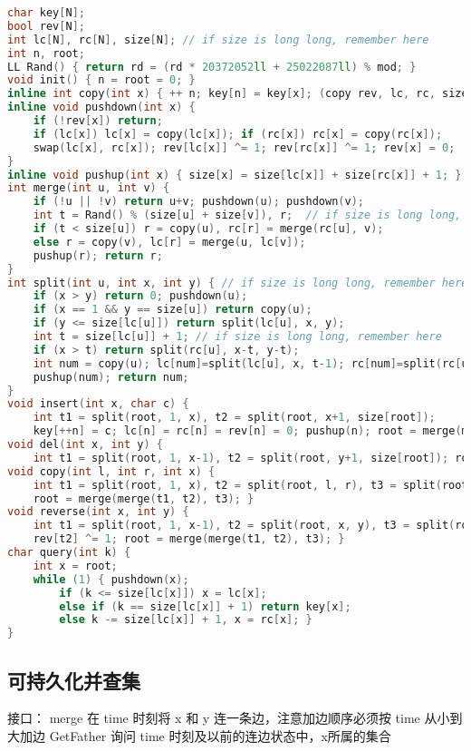 \documentclass{article}
\begin{document}
\begin{lstlisting}[language=C++]
char key[N];
bool rev[N];
int lc[N], rc[N], size[N]; // if size is long long, remember here
int n, root;
LL Rand() { return rd = (rd * 20372052ll + 25022087ll) % mod; }
void init() { n = root = 0; }
inline int copy(int x) { ++ n; key[n] = key[x]; (copy rev, lc, rc, size); return n; }
inline void pushdown(int x) {
	if (!rev[x]) return;
	if (lc[x]) lc[x] = copy(lc[x]); if (rc[x]) rc[x] = copy(rc[x]);
	swap(lc[x], rc[x]); rev[lc[x]] ^= 1; rev[rc[x]] ^= 1; rev[x] = 0;
}
inline void pushup(int x) { size[x] = size[lc[x]] + size[rc[x]] + 1; }
int merge(int u, int v) {
	if (!u || !v) return u+v; pushdown(u); pushdown(v);
	int t = Rand() % (size[u] + size[v]), r;  // if size is long long, remember here
	if (t < size[u]) r = copy(u), rc[r] = merge(rc[u], v);
	else r = copy(v), lc[r] = merge(u, lc[v]);
	pushup(r); return r;
}
int split(int u, int x, int y) { // if size is long long, remember here
	if (x > y) return 0; pushdown(u);
	if (x == 1 && y == size[u]) return copy(u);
	if (y <= size[lc[u]]) return split(lc[u], x, y);
	int t = size[lc[u]] + 1; // if size is long long, remember here
	if (x > t) return split(rc[u], x-t, y-t);
	int num = copy(u); lc[num]=split(lc[u], x, t-1); rc[num]=split(rc[u], 1, y-t);
	pushup(num); return num;
}
void insert(int x, char c) {
	int t1 = split(root, 1, x), t2 = split(root, x+1, size[root]);
	key[++n] = c; lc[n] = rc[n] = rev[n] = 0; pushup(n); root = merge(merge(t1, n), t2); }
void del(int x, int y) {
	int t1 = split(root, 1, x-1), t2 = split(root, y+1, size[root]); root = merge(t1, t2); }
void copy(int l, int r, int x) {
	int t1 = split(root, 1, x), t2 = split(root, l, r), t3 = split(root, x+1, size[root]);
	root = merge(merge(t1, t2), t3); }
void reverse(int x, int y) {
	int t1 = split(root, 1, x-1), t2 = split(root, x, y), t3 = split(root, y+1, size[root]);
	rev[t2] ^= 1; root = merge(merge(t1, t2), t3); }
char query(int k) {
	int x = root;
	while (1) {	pushdown(x);
		if (k <= size[lc[x]]) x = lc[x];
		else if (k == size[lc[x]] + 1) return key[x];
		else k -= size[lc[x]] + 1, x = rc[x]; }
}
\end{lstlisting}
\subsection{可持久化并查集}

接口：
 merge 在 time 时刻将 x 和 y 连一条边，注意加边顺序必须按 time 从小到大加边
 GetFather 询问 time 时刻及以前的连边状态中，x所属的集合
\end{document}
